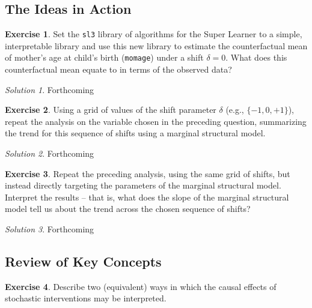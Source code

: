 \documentclass[
  12pt, krantz2,
]{krantz}
\newcommand{\passthrough}[1]{#1}
\newcommand{\1}{\mathbbm{1}}
\theoremstyle{definition}
\theoremstyle{definition}
\theoremstyle{definition}
\newtheorem{exercise}{Exercise}[chapter]
\theoremstyle{definition}
\theoremstyle{remark}
\newtheorem*{solution}{Solution}
\begin{document}
\hypertarget{the-ideas-in-action}{%
\subsection{The Ideas in Action}\label{the-ideas-in-action}}

\begin{exercise}
Set the \passthrough{\lstinline!sl3!} library of algorithms for the Super Learner to a simple,
interpretable library and use this new library to estimate the counterfactual
mean of mother's age at child's birth (\passthrough{\lstinline!momage!}) under a shift \(\delta = 0\).
What does this counterfactual mean equate to in terms of the observed data?
\end{exercise}

\begin{solution}
Forthcoming
\end{solution}

\begin{exercise}
Using a grid of values of the shift parameter \(\delta\) (e.g., \(\{-1, 0, +1\}\)),
repeat the analysis on the variable chosen in the preceding question,
summarizing the trend for this sequence of shifts using a marginal structural
model.
\end{exercise}

\begin{solution}
Forthcoming
\end{solution}

\begin{exercise}
Repeat the preceding analysis, using the same grid of shifts, but instead
directly targeting the parameters of the marginal structural model. Interpret
the results -- that is, what does the slope of the marginal structural model
tell us about the trend across the chosen sequence of shifts?
\end{exercise}

\begin{solution}
Forthcoming
\end{solution}

\hypertarget{review-of-key-concepts-2}{%
\subsection{Review of Key Concepts}\label{review-of-key-concepts-2}}

\begin{exercise}
Describe two (equivalent) ways in which the causal effects of stochastic
interventions may be interpreted.
\end{exercise}
\end{document}
